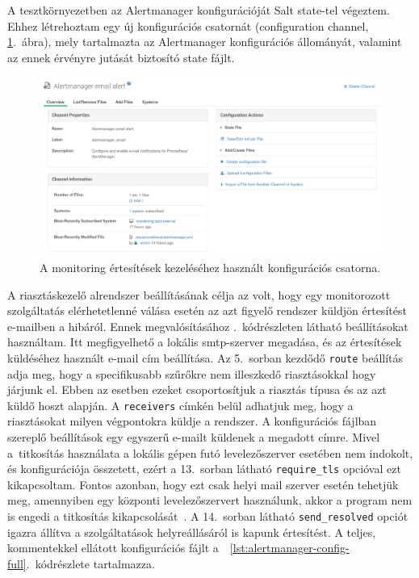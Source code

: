 A tesztkörnyezetben az Alertmanager konfigurációját Salt state-tel végeztem. Ehhez létrehoztam egy új konfigurációs csatornát (configuration channel, \ref{fig:alertmanager-state}.~ábra), mely tartalmazta az Alertmanager konfigurációs állományát, valamint az ennek érvényre jutását biztosító state fájlt.

\begin{figure}
	\centering
	\includegraphics[width=15cm]{figures/alertmanager-state.png}
	\caption{A monitoring értesítések kezeléséhez használt konfigurációs csatorna.}
	\label{fig:alertmanager-state}
\end{figure}

A riasztáskezelő alrendszer beállításának célja az volt, hogy egy monitorozott szolgáltatás elérhetetlenné válása esetén az azt figyelő rendszer küldjön értesítést e-mailben a hibáról. Ennek megvalósításához .~kódrészleten látható beállításokat használtam. Itt megfigyelhető a lokális \acrshort{smtp}-szerver megadása, és az értesítések küldéséhez használt e-mail cím beállítása.
Az 5.~sorban kezdődő \texttt{route} beállítás adja meg, hogy a specifikusabb szűrőkre nem illeszkedő riasztásokkal hogy járjunk el. Ebben az esetben ezeket csoportosítjuk a riasztás típusa és az azt küldő hoszt alapján. A \texttt{receivers} címkén belül adhatjuk meg, hogy a riasztásokat milyen végpontokra küldje a rendszer. A konfigurációs fájlban szereplő beállítások egy egyszerű e-mailt küldenek a megadott címre. Mivel a~titkosítás használata a lokális gépen futó levelezőszerver esetében nem indokolt, és konfigurációja összetett, ezért a 13.~sorban látható \texttt{require\_tls} opcióval ezt kikapcsoltam. Fontos azonban, hogy ezt csak helyi mail szerver esetén tehetjük meg, amennyiben egy központi levelezőszervert használunk, akkor a program nem is engedi a titkosítás kikapcsolását~\cite{PrometheusAlertmanagerConfig}.
A 14.~sorban látható \texttt{send\_resolved} opciót igazra állítva a szolgáltatások helyreállásáról is kapunk értesítést. %
A teljes, kommentekkel ellátott konfigurációs fájlt a~~\ref{lst:alertmanager-config-full}.~kódrészlete tartalmazza.


